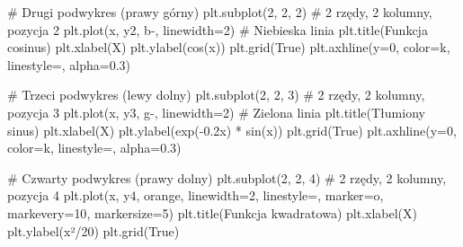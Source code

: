 \documentclass[
  polish,
  letterpaper,
  DIV=11,
  numbers=noendperiod]{scrreprt}
\newenvironment{Shaded}{\begin{snugshade}}{\end{snugshade}}
\newcommand{\CommentTok}[1]{\textcolor[rgb]{0.37,0.37,0.37}{#1}}
\newcommand{\DecValTok}[1]{\textcolor[rgb]{0.68,0.00,0.00}{#1}}
\newcommand{\FloatTok}[1]{\textcolor[rgb]{0.68,0.00,0.00}{#1}}
\newcommand{\NormalTok}[1]{\textcolor[rgb]{0.00,0.23,0.31}{#1}}
\newcommand{\OperatorTok}[1]{\textcolor[rgb]{0.37,0.37,0.37}{#1}}
\newcommand{\StringTok}[1]{\textcolor[rgb]{0.13,0.47,0.30}{#1}}
\newcommand{\VariableTok}[1]{\textcolor[rgb]{0.07,0.07,0.07}{#1}}
\begin{document}
\begin{Shaded}
\begin{Highlighting}[]
\CommentTok{\# Drugi podwykres (prawy górny)}
\NormalTok{plt.subplot(}\DecValTok{2}\NormalTok{, }\DecValTok{2}\NormalTok{, }\DecValTok{2}\NormalTok{)  }\CommentTok{\# 2 rzędy, 2 kolumny, pozycja 2}
\NormalTok{plt.plot(x, y2, }\StringTok{\textquotesingle{}b{-}\textquotesingle{}}\NormalTok{, linewidth}\OperatorTok{=}\DecValTok{2}\NormalTok{)  }\CommentTok{\# Niebieska linia}
\NormalTok{plt.title(}\StringTok{\textquotesingle{}Funkcja cosinus\textquotesingle{}}\NormalTok{)}
\NormalTok{plt.xlabel(}\StringTok{\textquotesingle{}X\textquotesingle{}}\NormalTok{)}
\NormalTok{plt.ylabel(}\StringTok{\textquotesingle{}cos(x)\textquotesingle{}}\NormalTok{)}
\NormalTok{plt.grid(}\VariableTok{True}\NormalTok{)}
\NormalTok{plt.axhline(y}\OperatorTok{=}\DecValTok{0}\NormalTok{, color}\OperatorTok{=}\StringTok{\textquotesingle{}k\textquotesingle{}}\NormalTok{, linestyle}\OperatorTok{=}\StringTok{\textquotesingle{}{-}\textquotesingle{}}\NormalTok{, alpha}\OperatorTok{=}\FloatTok{0.3}\NormalTok{)}

\CommentTok{\# Trzeci podwykres (lewy dolny)}
\NormalTok{plt.subplot(}\DecValTok{2}\NormalTok{, }\DecValTok{2}\NormalTok{, }\DecValTok{3}\NormalTok{)  }\CommentTok{\# 2 rzędy, 2 kolumny, pozycja 3}
\NormalTok{plt.plot(x, y3, }\StringTok{\textquotesingle{}g{-}\textquotesingle{}}\NormalTok{, linewidth}\OperatorTok{=}\DecValTok{2}\NormalTok{)  }\CommentTok{\# Zielona linia}
\NormalTok{plt.title(}\StringTok{\textquotesingle{}Tłumiony sinus\textquotesingle{}}\NormalTok{)}
\NormalTok{plt.xlabel(}\StringTok{\textquotesingle{}X\textquotesingle{}}\NormalTok{)}
\NormalTok{plt.ylabel(}\StringTok{\textquotesingle{}exp({-}0.2x) * sin(x)\textquotesingle{}}\NormalTok{)}
\NormalTok{plt.grid(}\VariableTok{True}\NormalTok{)}
\NormalTok{plt.axhline(y}\OperatorTok{=}\DecValTok{0}\NormalTok{, color}\OperatorTok{=}\StringTok{\textquotesingle{}k\textquotesingle{}}\NormalTok{, linestyle}\OperatorTok{=}\StringTok{\textquotesingle{}{-}\textquotesingle{}}\NormalTok{, alpha}\OperatorTok{=}\FloatTok{0.3}\NormalTok{)}

\CommentTok{\# Czwarty podwykres (prawy dolny)}
\NormalTok{plt.subplot(}\DecValTok{2}\NormalTok{, }\DecValTok{2}\NormalTok{, }\DecValTok{4}\NormalTok{)  }\CommentTok{\# 2 rzędy, 2 kolumny, pozycja 4}
\NormalTok{plt.plot(x, y4, }\StringTok{\textquotesingle{}orange\textquotesingle{}}\NormalTok{, linewidth}\OperatorTok{=}\DecValTok{2}\NormalTok{, linestyle}\OperatorTok{=}\StringTok{\textquotesingle{}{-}{-}\textquotesingle{}}\NormalTok{, marker}\OperatorTok{=}\StringTok{\textquotesingle{}o\textquotesingle{}}\NormalTok{, markevery}\OperatorTok{=}\DecValTok{10}\NormalTok{, markersize}\OperatorTok{=}\DecValTok{5}\NormalTok{)}
\NormalTok{plt.title(}\StringTok{\textquotesingle{}Funkcja kwadratowa\textquotesingle{}}\NormalTok{)}
\NormalTok{plt.xlabel(}\StringTok{\textquotesingle{}X\textquotesingle{}}\NormalTok{)}
\NormalTok{plt.ylabel(}\StringTok{\textquotesingle{}x²/20\textquotesingle{}}\NormalTok{)}
\NormalTok{plt.grid(}\VariableTok{True}\NormalTok{)}


\end{Highlighting}
\end{Shaded}
\end{document}
